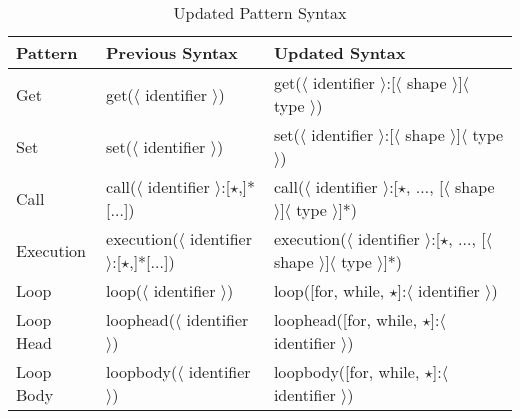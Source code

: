 \begin{table}[!htbp]
\begin{center}
\begin{tabular}{l|l|l}
\hline
Pattern    &    Previous Syntax                                                & Updated Syntax                                                                                                     \\
\hline
Get        &    get($\langle$ identifier $\rangle$)                            & get($\langle$ identifier $\rangle$:[$\langle$ shape $\rangle$]$\langle$ type $\rangle$)                            \\
Set        &    set($\langle$ identifier $\rangle$)                            & set($\langle$ identifier $\rangle$:[$\langle$ shape $\rangle$]$\langle$ type $\rangle$)                            \\
Call       &    call($\langle$ identifier $\rangle$:[$\star$,]*[$\dots$])      & call($\langle$ identifier $\rangle$:[$\star$, $\dots$, [$\langle$ shape $\rangle$]$\langle$ type $\rangle$]*)      \\
Execution  &    execution($\langle$ identifier $\rangle$:[$\star$,]*[$\dots$]) & execution($\langle$ identifier $\rangle$:[$\star$, $\dots$, [$\langle$ shape $\rangle$]$\langle$ type $\rangle$]*) \\
Loop       &    loop($\langle$ identifier $\rangle$)                           & loop([for, while, $\star$]:$\langle$ identifier $\rangle$)                                                         \\
Loop Head  &    loophead($\langle$ identifier $\rangle$)                       & loophead([for, while, $\star$]:$\langle$ identifier $\rangle$)                                                     \\
Loop Body  &    loopbody($\langle$ identifier $\rangle$)                       & loopbody([for, while, $\star$]:$\langle$ identifier $\rangle$)                                                     \\
\hline
\end{tabular}
\end{center}
\caption{Updated Pattern Syntax}
\end{table}
